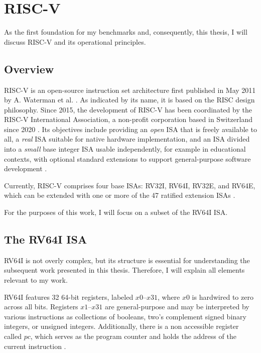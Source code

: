\chapter{RISC-V}\label{chap:riscv}

As the first foundation for my benchmarks and, consequently, this
thesis, I will discuss RISC-V and its operational principles.

\section{Overview}

RISC-V is an open-source instruction set architecture first published
in May 2011 by A. Waterman et al. \cite{first_riscv}. As indicated by
its name, it is based on the RISC design philosophy.  Since 2015, the development of RISC-V has been
coordinated by the RISC-V International Association, a non-profit
corporation based in Switzerland since 2020 \cite{riscvorg}. Its
objectives include providing an \emph{open} ISA that is freely
available to all, a \emph{real} ISA suitable for native hardware
implementation, and an ISA divided into a \emph{small} base integer
ISA usable independently, for example in educational contexts, with
optional standard extensions to support general-purpose software
development \cite[Chapter 1]{riscv-isa}.

Currently, RISC-V comprises four base ISAs: RV32I, RV64I, RV32E, and
RV64E, which can be extended with one or more of the 47 ratified
extension ISAs \cite[Preface]{riscv-isa}.

 

For the purposes of this work, I will focus on a subset of the RV64I
ISA.

\section{The RV64I ISA} \label{sec:riscvIsa}
RV64I is not overly complex, but its structure is essential for
understanding the subsequent work presented in this thesis.
Therefore, I will explain all elements relevant to my work.

RV64I features 32 64-bit registers, labeled $x0$–$x31$, where $x0$ is
hardwired to zero across all bits. Registers $x1$–$x31$ are
general-purpose and may be interpreted by various instructions as
collections of booleans, two's complement signed binary integers, or
unsigned integers. Additionally, there is a non accessible register
called $pc$, which serves as the program counter and holds the
address of the current instruction \cite[Chapters 4.1,
      2.1]{riscv-isa}.

